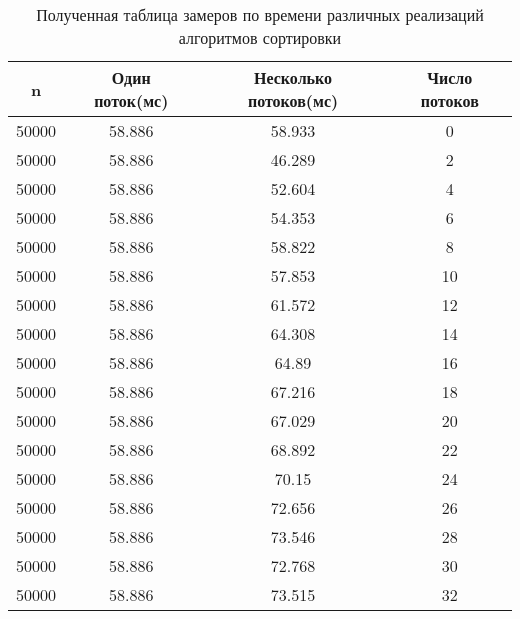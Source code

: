 \begin{table}[ht]
	\centering
	\caption{Полученная таблица замеров по времени различных реализаций алгоритмов сортировки}
	\begin{tabular}{|c|c|c|c|}
		\hline
		n       &  Один поток(мс) & Несколько потоков(мс) & Число потоков \\ \hline
		50000 & 58.886                  & 58.933                            & 0           \\ \hline
		50000 & 58.886                  & 46.289                            & 2           \\ \hline
		50000 & 58.886                  & 52.604                            & 4           \\ \hline
		50000 & 58.886                  & 54.353                            & 6           \\ \hline
		50000 & 58.886                  & 58.822                            & 8           \\ \hline
		50000 & 58.886                  & 57.853                            & 10          \\ \hline
		50000 & 58.886                  & 61.572                            & 12          \\ \hline
		50000 & 58.886                  & 64.308                            & 14          \\ \hline
		50000 & 58.886                  & 64.89                             & 16          \\ \hline
		50000 & 58.886                  & 67.216                            & 18          \\ \hline
		50000 & 58.886                  & 67.029                            & 20          \\ \hline
		50000 & 58.886                  & 68.892                            & 22          \\ \hline
		50000 & 58.886                  & 70.15                             & 24          \\ \hline
		50000 & 58.886                  & 72.656                            & 26          \\ \hline
		50000 & 58.886                  & 73.546                            & 28          \\ \hline
		50000 & 58.886                  & 72.768                            & 30          \\ \hline
		50000 & 58.886                  & 73.515                            & 32          \\ \hline

\end{tabular}
\end{table}
